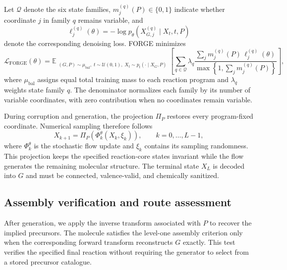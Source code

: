 \documentclass{article}
\begin{document}
Let $\mathcal{Q}$ denote the six state families, $m_j^{(q)}(P)\in\{0,1\}$ indicate whether coordinate $j$ in family $q$ remains variable, and
\begin{equation}
    \ell_j^{(q)}(\theta)
    =
    -\log p_\theta
    \left(
        X_{G,j}^{(q)}
        \mid X_t,t,P
    \right)
\end{equation}
denote the corresponding denoising loss. FORGE minimizes
\begin{equation}
    \mathcal{L}_{\mathrm{FORGE}}(\theta)
    =
    \mathbb{E}_{\substack{
        (G,P)\sim\mu_{\mathrm{bal}},\;
        t\sim\mathcal{U}(0,1),\;
        X_t\sim p_t(\cdot\mid X_G,P)}}
    \left[
        \sum_{q\in\mathcal{Q}}
        \lambda_q
        \frac{
            \sum_j m_j^{(q)}(P)\,
            \ell_j^{(q)}(\theta)
        }{
            \max\left\{
                1,\sum_j m_j^{(q)}(P)
            \right\}
        }
    \right],
\end{equation}
where $\mu_{\mathrm{bal}}$ assigns equal total training mass to each reaction program and $\lambda_q$ weights state family $q$. The denominator normalizes each family by its number of variable coordinates, with zero contribution when no coordinates remain variable.

During corruption and generation, the projection $\Pi_P$ restores every program-fixed coordinate. Numerical sampling therefore follows
\begin{equation}
    X_{k+1}
    =
    \Pi_P
    \left(
        \Phi_k^\theta(X_k,\xi_k)
    \right),
    \qquad k=0,\ldots,L-1,
\end{equation}
where $\Phi_k^\theta$ is the stochastic flow update and $\xi_k$ contains its sampling randomness. This projection keeps the specified reaction-core states invariant while the flow generates the remaining molecular structure. The terminal state $X_L$ is decoded into $G$ and must be connected, valence-valid, and chemically sanitized.

\subsection{Assembly verification and route assessment}

After generation, we apply the inverse transform associated with $P$ to recover the implied precursors. The molecule satisfies the level-one assembly criterion only when the corresponding forward transform reconstructs $G$ exactly. This test verifies the specified final reaction without requiring the generator to select from a stored precursor catalogue.
\end{document}
